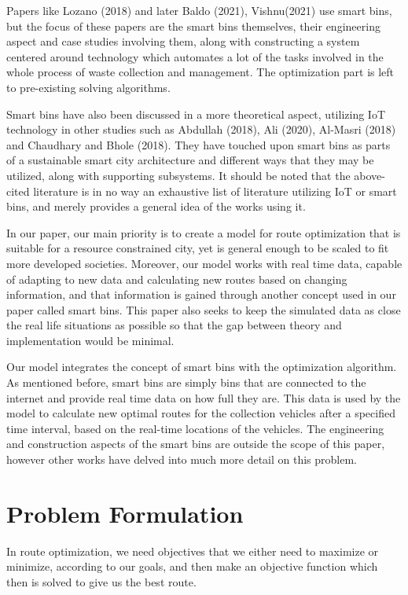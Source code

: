 \documentclass[12pt]{article}
\begin{document}
Papers like Lozano (2018) and later Baldo (2021), Vishnu(2021) use smart bins, but the focus of these papers are the smart bins themselves, their engineering aspect and case studies involving them, along with constructing a system centered around technology which automates a lot of the tasks involved in the whole process of waste collection and management. The optimization part is left to pre-existing solving algorithms.

Smart bins have also been discussed in a more theoretical aspect, utilizing IoT technology in other studies such as Abdullah (2018), Ali (2020), Al-Masri (2018) and Chaudhary and Bhole (2018). They have touched upon smart bins as parts of a sustainable smart city architecture and different ways that they may be utilized, along with supporting subsystems. It should be noted that the above-cited literature is in no way an exhaustive list of literature utilizing IoT or smart bins, and merely provides a general idea of the works using it.

In our paper, our main priority is to create a model for route optimization that is suitable for a resource constrained city, yet is general enough to be scaled to fit more developed societies. Moreover, our model works with real time data, capable of adapting to new data and calculating new routes based on changing information, and that information is gained through another concept used in our paper called smart bins. This paper also seeks to keep the simulated data as close the real life situations as possible so that the gap between theory and implementation would be minimal.

Our model integrates the concept of smart bins with the optimization algorithm. As mentioned before, smart bins are simply bins that are connected to the internet and provide real time data on how full they are. This data is used by the model to calculate new optimal routes for the collection vehicles after a specified time interval, based on the real-time locations of the vehicles. The engineering and construction aspects of the smart bins are outside the scope of this paper, however other works have delved into much more detail on this problem.

\section{Problem Formulation}

In route optimization, we need objectives that we either need to maximize or minimize, according to our goals, and then make an objective function which then is solved to give us the best route. 
\end{document}
